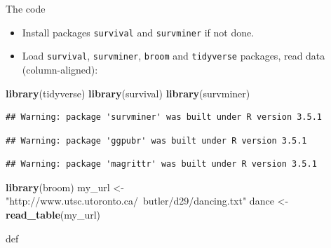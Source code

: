\documentclass[ignorenonframetext,]{beamer}
\newenvironment{Shaded}{\begin{snugshade}}{\end{snugshade}}
\newcommand{\KeywordTok}[1]{\textcolor[rgb]{0.13,0.29,0.53}{\textbf{#1}}}
\newcommand{\NormalTok}[1]{#1}
\newcommand{\StringTok}[1]{\textcolor[rgb]{0.31,0.60,0.02}{#1}}
\begin{document}
\begin{frame}[fragile]{The code}
\protect\hypertarget{the-code}{}

\begin{itemize}
\item
  Install packages \texttt{survival} and \texttt{survminer} if not done.
\item
  Load \texttt{survival}, \texttt{survminer}, \texttt{broom} and
  \texttt{tidyverse} packages, read data (column-aligned):
\end{itemize}

\begin{Shaded}
\begin{Highlighting}[]
\KeywordTok{library}\NormalTok{(tidyverse)}
\KeywordTok{library}\NormalTok{(survival)}
\KeywordTok{library}\NormalTok{(survminer)}
\end{Highlighting}
\end{Shaded}

\begin{verbatim}
## Warning: package 'survminer' was built under R version 3.5.1
\end{verbatim}

\begin{verbatim}
## Warning: package 'ggpubr' was built under R version 3.5.1
\end{verbatim}

\begin{verbatim}
## Warning: package 'magrittr' was built under R version 3.5.1
\end{verbatim}

\begin{Shaded}
\begin{Highlighting}[]
\KeywordTok{library}\NormalTok{(broom)}
\NormalTok{my_url <-}\StringTok{ "http://www.utsc.utoronto.ca/~butler/d29/dancing.txt"}
\NormalTok{dance <-}\StringTok{ }\KeywordTok{read_table}\NormalTok{(my_url)}
\end{Highlighting}
\end{Shaded}

def

\end{frame}
\end{document}
